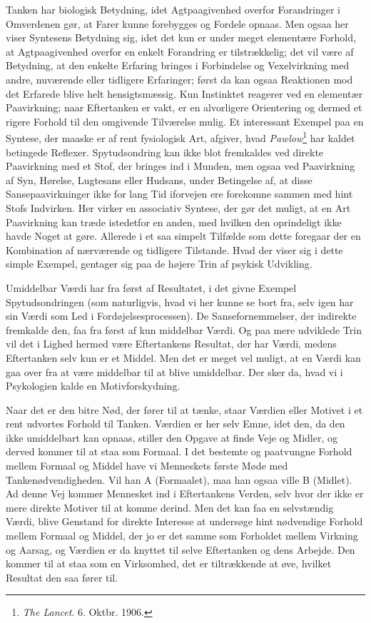 \documentclass[12pt,a4paper]{book}
\newcommand{\apage}[1]{\marginnote{\footnotesize\textit{[#1]}}}
\begin{document}
Tanken har biologisk Betydning, idet Agtpaagivenhed overfor
Forandringer i Omverdenen gør, at Farer kunne forebygges og Fordele
opnaas. Men ogsaa her viser Syntesens Betydning sig, idet det kun er
under meget elementære Forhold, at Agtpaagivenhed overfor en enkelt
Forandring er tilstrækkelig; det vil være af Betydning, at den enkelte
Erfaring bringes i Forbindelse og Vexelvirkning med andre, nuværende
eller tidligere Erfaringer; først da kan ogsaa Reaktionen mod det
Erfarede blive helt hensigtsmæssig. Kun Instinktet reagerer ved en
elementær Paavirkning; naar Eftertanken er vakt, er en alvorligere
Orientering og dermed et rigere Forhold til den omgivende Tilværelse
mulig. Et interessant Exempel paa en Syntese, der maaske er af rent
fysiologisk Art, afgiver, hvad \emph{Pawlow}\footnote{\emph{The
Lancet}. 6. Oktbr. 1906.} har kaldet betingede Reflexer. Spytudsondring
kan ikke blot fremkaldes ved direkte Paavirkning med et Stof, der
bringes ind i Munden, men ogsaa ved Paavirkning af Syn, Hørelse, \apage{21}
Lugtesans eller Hudsans, under Betingelse af, at disse
Sansepaavirkninger ikke for lang Tid iforvejen ere forekomne sammen
med hint Stofs Indvirken. Her virker en associativ Syntese, der gør
det muligt, at en Art Paavirkning kan træde istedetfor en anden, med
hvilken den oprindeligt ikke havde Noget at gøre. Allerede i et saa
simpelt Tilfælde som dette foregaar der en Kombination af nærværende
og tidligere Tilstande. Hvad der viser sig i dette simple Exempel,
gentager sig paa de højere Trin af psykisk Udvikling.

Umiddelbar Værdi har fra først af Resultatet, i det givne Exempel
Spytudsondringen (som naturligvis, hvad vi her kunne se bort fra, selv
igen har sin Værdi som Led i Fordøjelsesprocessen). De
Sansefornemmelser, der indirekte fremkalde den, faa fra først af kun
middelbar Værdi. Og paa mere udviklede Trin vil det i Lighed hermed
være Eftertankens Resultat, der har Værdi, medens Eftertanken selv kun
er et Middel. Men det er meget vel muligt, at en Værdi kan gaa over
fra at være middelbar til at blive umiddelbar. Der sker da, hvad vi i
Psykologien kalde en Motivforskydning.

Naar det er den bitre Nød, der fører til at tænke, staar Værdien eller
Motivet i et rent udvortes Forhold til Tanken. Værdien er her selv
Emne, idet den, da den ikke umiddelbart kan opnaas, stiller den
Opgave at finde Veje og Midler, og derved kommer til at staa som
Formaal. I det bestemte og paatvungne Forhold mellem Formaal og Middel
have vi Menneskets første Møde med Tankenødvendigheden. Vil han A
(Formaalet), maa han ogsaa ville B (Midlet). Ad denne Vej kommer
Mennesket ind i Eftertankens Verden, selv hvor der ikke er mere direkte
Motiver til at komme derind. Men det kan faa en selvstændig Værdi,
blive Genstand for direkte Interesse at undersøge hint nødvendige
Forhold mellem Formaal og Middel, der jo er det samme som Forholdet
mellem Virkning og Aarsag, og Værdien er da knyttet til selve
Eftertanken og dens Arbejde. Den kommer til at staa som en Virksomhed,
det er tiltrækkende at øve, hvilket Resultat den saa fører til.
\end{document}
